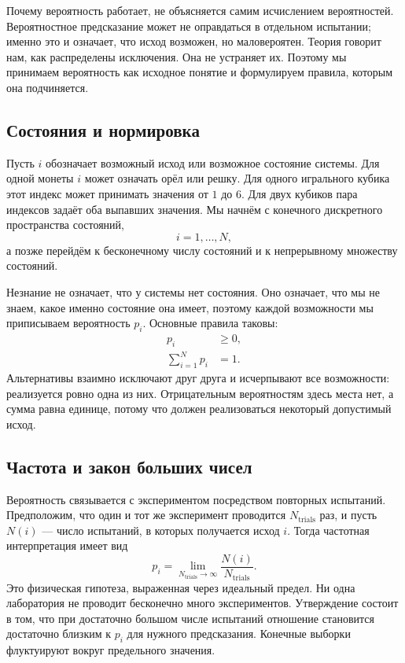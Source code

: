 Почему вероятность работает, не объясняется самим исчислением вероятностей. Вероятностное предсказание может не оправдаться в отдельном испытании; именно это и означает, что исход возможен, но маловероятен. Теория говорит нам, как распределены исключения. Она не устраняет их. Поэтому мы принимаем вероятность как исходное понятие и формулируем правила, которым она подчиняется.

\subsection{Состояния и нормировка}

Пусть \(i\) обозначает возможный исход или возможное состояние системы. Для одной монеты \(i\) может означать орёл или решку. Для одного игрального кубика этот индекс может принимать значения от \(1\) до \(6\). Для двух кубиков пара индексов задаёт оба выпавших значения. Мы начнём с конечного дискретного пространства состояний,
\begin{equation}
 i=1,\ldots,N,
\end{equation}
а позже перейдём к бесконечному числу состояний и к непрерывному множеству состояний.

Незнание не означает, что у системы нет состояния. Оно означает, что мы не знаем, какое именно состояние она имеет, поэтому каждой возможности мы приписываем вероятность \(p_i\). Основные правила таковы:
\begin{align}
 p_i &\geq 0, \label{eq:sm1-prob-positive}\\
 \sum_{i=1}^{N}p_i &=1. \label{eq:sm1-prob-normalization}
\end{align}
Альтернативы взаимно исключают друг друга и исчерпывают все возможности: реализуется ровно одна из них. Отрицательным вероятностям здесь места нет, а сумма равна единице, потому что должен реализоваться некоторый допустимый исход.

\subsection{Частота и закон больших чисел}

Вероятность связывается с экспериментом посредством повторных испытаний. Предположим, что один и тот же эксперимент проводится \(N_{\mathrm{trials}}\) раз, и пусть \(N(i)\) — число испытаний, в которых получается исход \(i\). Тогда частотная интерпретация имеет вид
\begin{equation}
 p_i=
 \lim_{N_{\mathrm{trials}}\to\infty}
 \frac{N(i)}{N_{\mathrm{trials}}}.
 \label{eq:sm1-frequency}
\end{equation}
Это физическая гипотеза, выраженная через идеальный предел. Ни одна лаборатория не проводит бесконечно много экспериментов. Утверждение состоит в том, что при достаточно большом числе испытаний отношение становится достаточно близким к \(p_i\) для нужного предсказания. Конечные выборки флуктуируют вокруг предельного значения.

